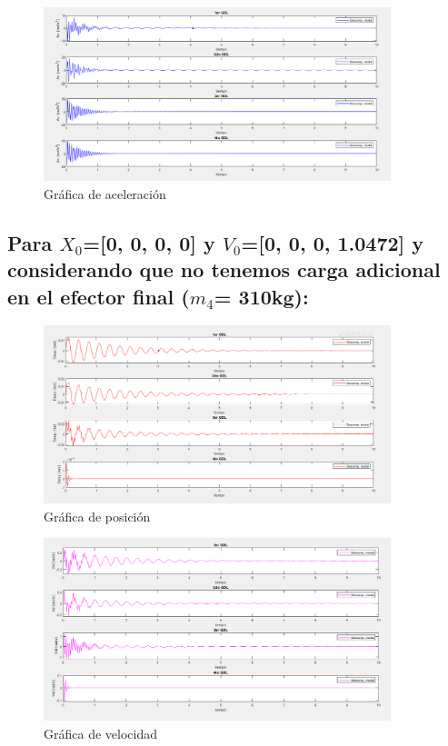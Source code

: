 \documentclass{aleph-revista}
\begin{document}
\begin{figure}[H]
    \centering
    \includegraphics[width=0.90\textwidth]{Imagenes/r9.png}
    \caption{Gráfica de aceleración}
    \label{fig:etiqueta de la figura}
\end{figure}


\subsection{Para $X_0$=[0, 0, 0, 0] y $V_0$=[0, 0, 0, 1.0472] y considerando que no tenemos carga adicional en el efector final ($m_4$= 310kg):}
\begin{figure}[H]
    \centering
    \includegraphics[width=0.90\textwidth]{Imagenes/r10.png}
    \caption{Gráfica de posición}
    \label{fig:etiqueta de la figura}
\end{figure}

\begin{figure}[H]
    \centering
    \includegraphics[width=0.90\textwidth]{Imagenes/r11.png}
    \caption{Gráfica de velocidad}
    \label{fig:etiqueta de la figura}
\end{figure}
\end{document}
